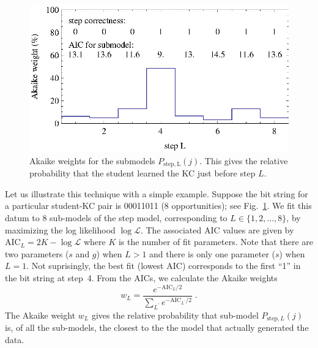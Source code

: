\documentclass{acmlarge-edm}
\begin{document}
\begin{figure}
  \centering \includegraphics{step-weights.eps}
   \caption{Akaike weights for the submodels $P_\mathrm{step,L}(j)$.  
     This gives the relative probability that
      the student learned the KC just before step $L$.}
    \label{step-weights}
\end{figure}

Let us illustrate this technique with a simple example.  Suppose the
bit string for a particular student-KC pair is 00011011 (8
opportunities); see Fig.~\ref{step-weights}.  We fit this datum to 8
sub-models of the step model, corresponding to $L\in\{1,2,\ldots,8\}$,
by maximizing the log likelihood $\log\mathcal{L}$.  The associated
AIC values are given by $\mathrm{AIC}_L=2 K-\log \mathcal{L}$ where
$K$ is the number of fit parameters.  Note that there are two
parameters ($s$ and $g$) when $L>1$ and there is only one parameter
($s$) when $L=1$.
%
%
Not suprisingly, the best fit (lowest AIC) corresponds to the first
``1'' in the bit string at step~4.  From the AICs, we calculate 
the Akaike weights
%
\begin{equation}
     w_L=\frac{e^{-\mathrm{AIC}_L/2} }{\sum_{L^\prime}
       e^{-\mathrm{AIC}_{L^\prime}/2}} \; .
\end{equation}
%
The Akaike weight $w_L$ gives the relative probability that sub-model 
$P_{\mathrm{step},L}(j)$ is, of all the sub-models, the closest to the 
the model that actually generated the data.
\end{document}
